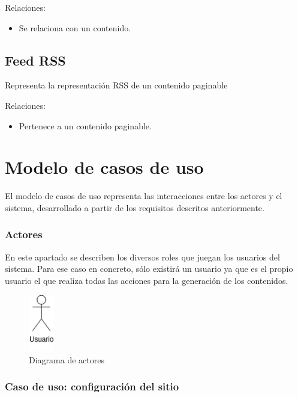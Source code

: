 Relaciones:
\begin{itemize}
    \item Se relaciona con un contenido.
\end{itemize}

\subsection{Feed RSS}

Representa la representación RSS de un contenido paginable

Relaciones:
\begin{itemize}
    \item Pertenece a un contenido paginable.
\end{itemize}


\section{Modelo de casos de uso}

El modelo de casos de uso representa las interacciones entre los actores y el sistema, 
desarrollado a partir de los requisitos descritos anteriormente.

\subsubsection{Actores}

En este apartado se describen los diversos roles que juegan los usuarios del sistema.
Para ese caso en concreto, sólo existirá un usuario ya que es el propio usuario
el que realiza todas las acciones para la generación de los contenidos.

\begin{figure}[h]
    \centering
    \includegraphics[width=0.1\textwidth]{4_analisis/actor}
    \caption{Diagrama de actores}
    \label{fig:actores}
\end{figure}

\subsubsection{Caso de uso: configuración del sitio}

